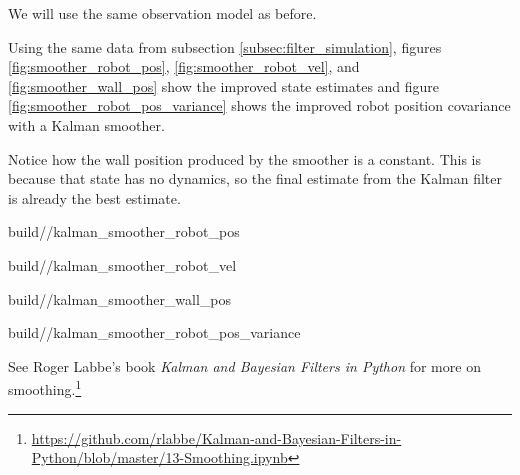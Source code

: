 We will use the same observation model as before.

Using the same data from subsection \ref{subsec:filter_simulation}, figures
\ref{fig:smoother_robot_pos}, \ref{fig:smoother_robot_vel}, and
\ref{fig:smoother_wall_pos} show the improved \gls{state} estimates and figure
\ref{fig:smoother_robot_pos_variance} shows the improved robot position
covariance with a Kalman smoother.

Notice how the wall position produced by the smoother is a constant. This is
because that \gls{state} has no dynamics, so the final estimate from the Kalman
filter is already the best estimate.
\begin{svg}{build/\chapterpath/kalman_smoother_robot_pos}
  \caption{Robot position with Kalman smoother}
  \label{fig:smoother_robot_pos}
\end{svg}
\begin{svg}{build/\chapterpath/kalman_smoother_robot_vel}
  \caption{Robot velocity with Kalman smoother}
  \label{fig:smoother_robot_vel}
\end{svg}
\begin{svg}{build/\chapterpath/kalman_smoother_wall_pos}
  \caption{Wall position with Kalman smoother}
  \label{fig:smoother_wall_pos}
\end{svg}
\begin{svg}{build/\chapterpath/kalman_smoother_robot_pos_variance}
  \caption{Robot position variance with Kalman smoother}
  \label{fig:smoother_robot_pos_variance}
\end{svg}

See Roger Labbe's book \textit{Kalman and Bayesian Filters in Python} for more
on
smoothing.\footnote{\url{https://github.com/rlabbe/Kalman-and-Bayesian-Filters-in-Python/blob/master/13-Smoothing.ipynb}}
